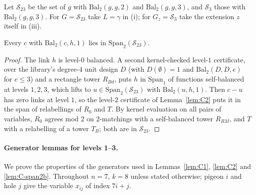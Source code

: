 Let $\mathcal S_{23}$ be the set of $g$ with $\mathrm{Bal}_2(g,g,2)$ and
$\mathrm{Bal}_2(g,g,3)$, and $\mathcal S_3$ those with
$\mathrm{Bal}_2(g,g,3)$.  For $G=\mathcal S_{23}$ take
$L=\gamma$ in (i); for $G_z=\mathcal S_3$ take the extension $z$ itself in (iii).

\begin{lemma}[condition (ii)]\label{lem:C-span2b}
Every $c$ with $\mathrm{Bal}_2(c,h,1)$ lies in
$\mathrm{Span}_2(\mathcal S_{23})$.
\end{lemma}

\begin{proof}
The link $h$ is level-$0$ balanced.  A second kernel-checked level-$1$ certificate,
over the library's degree-$4$ unit design $D$ (with $D(\emptyset)=1$ and
$\mathrm{Bal}_2(D,D,e)$ for $e\le3$) and a rectangle tower $R_{Bd}$, puts $h$ in
$\mathrm{Span}_1$ of functions self-balanced at levels $1,2,3$, which lifts to $u\in
\mathrm{Span}_2(\mathcal S_{23})$ with $\mathrm{Bal}_2(u,h,1)$.
Then $c-u$ has zero links at level $1$, so the level-$2$ certificate of
Lemma~\ref{lem:C2} puts it in the span of relabellings of $R_0$ and $T$.  By kernel
evaluation on all pairs of variables, $R_0$ agrees mod $2$ on $2$-matchings with a
self-balanced tower $R_{RM}$, and $T$ with a relabelling of a tower $T_B$; both are in
$\mathcal S_{23}$.
\end{proof}


\paragraph{Generator lemmas for levels 1--3.}
We prove the properties of the generators used in Lemmas~\ref{lem:C1}, \ref{lem:C2} and
\ref{lem:C-span2b}.  Throughout $n=7$, $k=8$ unless stated otherwise; pigeon $i$ and hole $j$
give the variable $x_{ij}$ of index $7i+j$.

